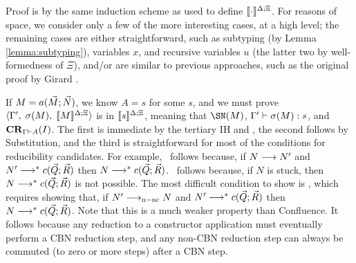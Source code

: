 \documentclass{article}
\begin{document}
\begin{myproof}
\else
%
Proof is by the same induction scheme as used to define
$\interp{\cdot}$.  For reasons of space, we consider only a few of the
more interesting cases, at a high level; the remaining cases are
either straightforward, such as subtyping (by Lemma
\ref{lemma:subtyping}), variables $x$, and recursive variables $u$
(the latter two by well-formedness of $\Xi$), and/or are similar to
previous approaches, such as the original proof by Girard
\cite{girard-proofs-types}.

If $M=\ctorapp{a}{\vec{M}}{\vec{N}}$, we know $A=s$ for some $s$, and
we must prove $\triple{\Gamma'}{\sigma(M)}{\interp{M}}$ is in
$\interp{s}$, meaning that $\SN(M)$, $\typej[\Gamma']{\sigma(M)}{s}$, and
$\CR{\Gamma}{A}{I}$. The first is immediate by the tertiary IH and
\CRone, the second follows by Substitution, and the third is
straightforward for most of the conditions for reducibility
candidates. For example, \CRtwo\ follows because, if $N\rrto N'$ and
$N'\rrtostar\ctorapp{c}{\vec{Q}}{\vec{R}}$ then
$N\rrtostar\ctorapp{c}{\vec{Q}}{\vec{R}}$. \CRfour\ follows because,
if $N$ is stuck, then $N\rrtostar\ctorapp{c}{\vec{Q}}{\vec{R}}$ is not
possible. The most difficult condition to show is \CRthree, which
requires showing that, if $N'\rrtocbnnc N$ and
$N'\rrtostar\ctorapp{c}{\vec{Q}}{\vec{R}}$ then
$N\rrtostar\ctorapp{c}{\vec{Q}}{\vec{R}}$. Note that this is a much
weaker property than Confluence. It follows because any reduction to a
constructor application must eventually perform a CBN reduction step,
and any non-CBN reduction step can always be commuted (to zero or more
steps) after a CBN step.



\end{myproof}
\end{document}
